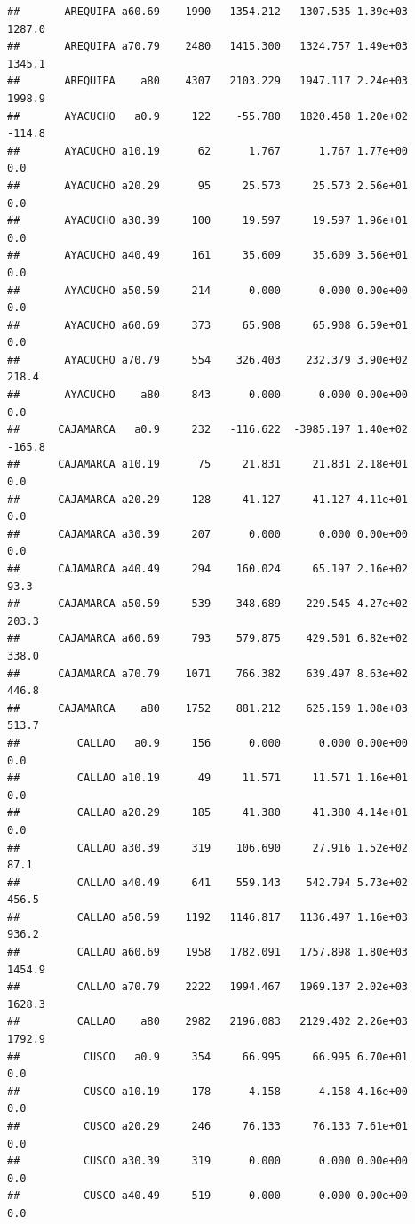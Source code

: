 \documentclass[
]{article}
\begin{document}
\begin{verbatim}
##       AREQUIPA a60.69    1990   1354.212   1307.535 1.39e+03     1287.0
##       AREQUIPA a70.79    2480   1415.300   1324.757 1.49e+03     1345.1
##       AREQUIPA    a80    4307   2103.229   1947.117 2.24e+03     1998.9
##       AYACUCHO   a0.9     122    -55.780   1820.458 1.20e+02     -114.8
##       AYACUCHO a10.19      62      1.767      1.767 1.77e+00        0.0
##       AYACUCHO a20.29      95     25.573     25.573 2.56e+01        0.0
##       AYACUCHO a30.39     100     19.597     19.597 1.96e+01        0.0
##       AYACUCHO a40.49     161     35.609     35.609 3.56e+01        0.0
##       AYACUCHO a50.59     214      0.000      0.000 0.00e+00        0.0
##       AYACUCHO a60.69     373     65.908     65.908 6.59e+01        0.0
##       AYACUCHO a70.79     554    326.403    232.379 3.90e+02      218.4
##       AYACUCHO    a80     843      0.000      0.000 0.00e+00        0.0
##      CAJAMARCA   a0.9     232   -116.622  -3985.197 1.40e+02     -165.8
##      CAJAMARCA a10.19      75     21.831     21.831 2.18e+01        0.0
##      CAJAMARCA a20.29     128     41.127     41.127 4.11e+01        0.0
##      CAJAMARCA a30.39     207      0.000      0.000 0.00e+00        0.0
##      CAJAMARCA a40.49     294    160.024     65.197 2.16e+02       93.3
##      CAJAMARCA a50.59     539    348.689    229.545 4.27e+02      203.3
##      CAJAMARCA a60.69     793    579.875    429.501 6.82e+02      338.0
##      CAJAMARCA a70.79    1071    766.382    639.497 8.63e+02      446.8
##      CAJAMARCA    a80    1752    881.212    625.159 1.08e+03      513.7
##         CALLAO   a0.9     156      0.000      0.000 0.00e+00        0.0
##         CALLAO a10.19      49     11.571     11.571 1.16e+01        0.0
##         CALLAO a20.29     185     41.380     41.380 4.14e+01        0.0
##         CALLAO a30.39     319    106.690     27.916 1.52e+02       87.1
##         CALLAO a40.49     641    559.143    542.794 5.73e+02      456.5
##         CALLAO a50.59    1192   1146.817   1136.497 1.16e+03      936.2
##         CALLAO a60.69    1958   1782.091   1757.898 1.80e+03     1454.9
##         CALLAO a70.79    2222   1994.467   1969.137 2.02e+03     1628.3
##         CALLAO    a80    2982   2196.083   2129.402 2.26e+03     1792.9
##          CUSCO   a0.9     354     66.995     66.995 6.70e+01        0.0
##          CUSCO a10.19     178      4.158      4.158 4.16e+00        0.0
##          CUSCO a20.29     246     76.133     76.133 7.61e+01        0.0
##          CUSCO a30.39     319      0.000      0.000 0.00e+00        0.0
##          CUSCO a40.49     519      0.000      0.000 0.00e+00        0.0

\end{verbatim}
\end{document}
